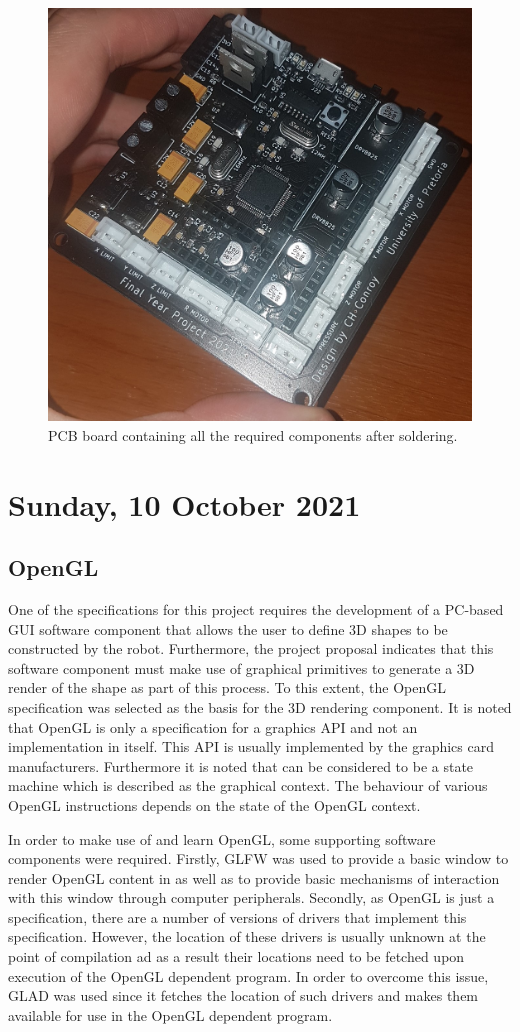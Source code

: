 \begin{figure}[H]
	\centering
	\includegraphics[width=0.6\linewidth]{figures/202110/final-pcb.jpg}
	\caption{PCB board containing all the required components after soldering.}
	\label{fig:assembled-pcb}
\end{figure}

\pendsign

\section[2021/10/04]{Sunday, 10 October 2021}

\subsection{OpenGL}

One of the specifications for this project requires the development of a PC-based \ac{GUI} software component that allows the user to define 3D shapes to be constructed by the robot. Furthermore, the project proposal indicates that this software component must make use of graphical primitives to generate a 3D render of the shape as part of this process. To this extent, the OpenGL specification was selected as the basis for the 3D rendering component. It is noted that OpenGL is only a specification for a graphics \ac{API} and not an implementation in itself. This \ac{API} is usually implemented by the graphics card manufacturers. Furthermore it is noted that can be considered to be a state machine which is described as the graphical context. The behaviour of various OpenGL instructions depends on the state of the OpenGL context.

In order to make use of and learn OpenGL, some supporting software components were required. Firstly, \ac{GLFW} was used to provide a basic window to render OpenGL content in as well as to provide basic mechanisms of interaction with this window through computer peripherals. Secondly, as OpenGL is just a specification, there are a number of versions of drivers that implement this specification. However, the location of these drivers is usually unknown at the point of compilation ad as a result their locations need to be fetched upon execution of the OpenGL dependent program. In order to overcome this issue, \ac{GLAD} was used since it fetches the location of such drivers and makes them available for use in the OpenGL dependent program.

